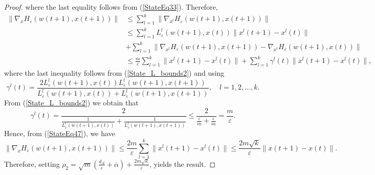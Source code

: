 \documentclass[11pt]{article}
\numberwithin{equation}{section}
\begin{document}
\begin{proof}
where the last equality follows from (\ref{StateEq33}). Therefore,
\begin{align}
	\| \nabla_x H_{\varepsilon}(w(t+1),x(t+1)) \| 
	&\leq \sum\limits_{l=1}^{k} \| \nabla_{x^l} H_{\varepsilon}(w(t+1),x(t+1)) \| \\
	&\leq \sum\limits_{l=1}^{k} L^l_{\varepsilon}(w(t+1),x(t)) \|x^l(t+1) - x^l(t)\| \\
	&+ \sum\limits_{l=1}^{k} \| \nabla_{x^l} H_{\varepsilon}(w(t+1),x(t+1)) - \nabla_{x^l} H_{\varepsilon}(w(t+1),x(t))\| \\
	&\leq \frac{m}{\varepsilon} \sum\limits_{l=1}^{k} \|x^l(t+1)-x^l(t)\| + \sum\limits_{l=1}^{k} \gamma^l(t) \|x^l(t+1)-x^l(t)\| , \label{StateEq47}
\end{align}
where the last inequality follows from (\ref{State_L_bounds2}) and  using
\begin{equation*}
	\gamma^l(t) = \frac{2 L^l_{\varepsilon}(w(t+1),x(t)) L^l_{\varepsilon}(w(t+1),x(t+1))}{L^l_{\varepsilon}(w(t+1),x(t)) + L^l_{\varepsilon}(w(t+1),x(t+1))} , \quad l=1,2, \ldots, k.
\end{equation*}
From (\ref{State_L_bounds2}) we obtain that
\begin{equation*}
	\gamma^l(t) = \frac{2}{\frac{1}{L^l_{\varepsilon}(w(t+1),x(t))} + \frac{1}{L^l_{\varepsilon}(w(t+1),x(t+1))}} \leq \frac{2}{\frac{\varepsilon}{m} + \frac{\varepsilon}{m}} = \frac{m}{\varepsilon} .
\end{equation*}
Hence, from (\ref{StateEq47}), we have 
\begin{equation*}
	\| \nabla_x H_{\varepsilon}(w(t+1),x(t+1))\| \leq \frac{2m}{\varepsilon} \sum\limits_{l=1}^{k} \|x^l(t+1)-x^l(t)\| \leq \frac{2m\sqrt{k}}{\varepsilon} \|x(t+1) - x(t)\|.
\end{equation*}
Therefore, setting $\rho_2 = \sqrt{m} \left( \frac{d_{\mathcal{A}}}{\varepsilon} + \overline{\alpha} \right) + \frac{2m\sqrt{k}}{\varepsilon}$, yields the result.
\end{proof}
\end{document}
